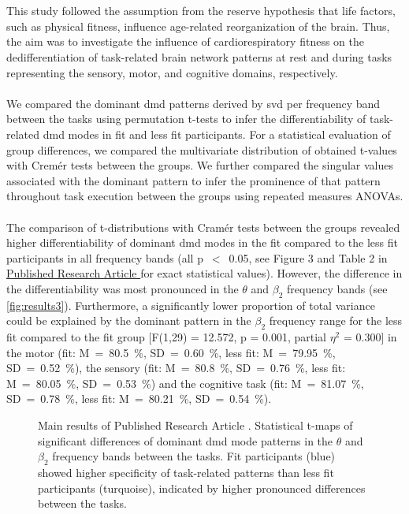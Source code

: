 \hyperref[pub:paperIII]{}\\
\\
This study followed the assumption from the reserve hypothesis that life factors, such as physical fitness, influence age-related reorganization of the brain. Thus, the aim was to investigate the influence of cardiorespiratory fitness on the dedifferentiation of task-related brain network patterns at rest and during tasks representing the sensory, motor, and cognitive domains, respectively.\\
\\
We compared the dominant \gls{dmd} patterns derived by \gls{svd} per frequency band between the tasks using permutation t-tests to infer the differentiability of task-related \gls{dmd} modes in fit and less fit participants. For a statistical evaluation of group differences, we compared the multivariate distribution of obtained t-values with Cremér tests between the groups. We further compared the singular values associated with the dominant pattern to infer the prominence of that pattern throughout task execution between the groups using repeated measures ANOVAs.\\
\\
The comparison of t-distributions with Cramér tests between the groups revealed higher differentiability of dominant \gls{dmd} modes in the fit compared to the less fit participants in all frequency bands (all p~$<$~0.05, see Figure 3 and Table 2 in \hyperref[pub:paperIII]{Published Research Article } for exact statistical values). However, the difference in the differentiability was most pronounced in the $\theta$ and $\beta_2$ frequency bands (see \autoref{fig:results3}). Furthermore, a significantly lower proportion of total variance could be explained by the dominant pattern in the $\beta_2$ frequency range for the less fit compared to the fit group [F(1,29) = 12.572, p = 0.001, partial $\eta^{2}$ = 0.300] in the motor (fit: M~=~80.5~\%, SD~=~0.60~\%, less fit: M~=~79.95~\%, SD~=~0.52~\%), the sensory (fit: M~=~80.8~\%, SD~=~0.76~\%, less fit: M~=~80.05~\%, SD~=~0.53~\%) and the cognitive task (fit: M~=~81.07~\%, SD~=~0.78~\%, less fit: M~=~80.21~\%, SD~=~0.54~\%).\\

\begin{figure}[ht]
    \centering
    
    \caption[Main results of Published Research Article ]{Main results of Published Research Article . Statistical t-maps of significant differences of dominant \gls{dmd} mode patterns in the $\theta$ and $\beta_2$ frequency bands between the tasks. Fit participants (blue) showed higher specificity of task-related patterns than less fit participants (turquoise), indicated by higher pronounced differences between the tasks.}
    \label{fig:results3}
\end{figure}

